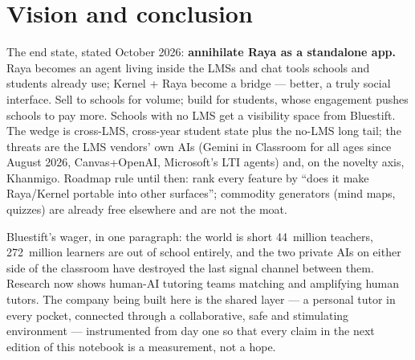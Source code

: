 \documentclass[11pt,a4paper]{article}
\let\oldsection\section
\renewcommand{\section}{\clearpage\oldsection}
\begin{document}
\section{Vision and conclusion}

The end state, stated October 2026: \textbf{annihilate Raya as a standalone
app.} Raya becomes an agent living inside the LMSs and chat tools schools and
students already use; Kernel + Raya become a bridge --- better, a truly social
interface. Sell to schools for volume; build for students, whose engagement
pushes schools to pay more. Schools with no LMS get a visibility space from
Bluestift. The wedge is cross-LMS, cross-year student state plus the no-LMS
long tail; the threats are the LMS vendors' own AIs (Gemini in Classroom for
all ages since August 2026, Canvas+OpenAI, Microsoft's LTI agents) and, on the
novelty axis, Khanmigo. Roadmap rule until then: rank every feature by ``does
it make Raya/Kernel portable into other surfaces''; commodity generators (mind
maps, quizzes) are already free elsewhere and are not the moat.

Bluestift's wager, in one paragraph: the world is short 44~million teachers,
272~million learners are out of school entirely, and the two private AIs on
either side of the classroom have destroyed the last signal channel between
them. Research now shows human-AI tutoring teams matching and amplifying human
tutors. The company being built here is the shared layer --- a personal tutor
in every pocket, connected through a collaborative, safe and stimulating
environment --- instrumented from day one so that every claim in the next
edition of this notebook is a measurement, not a hope.

\clearpage


\end{document}
